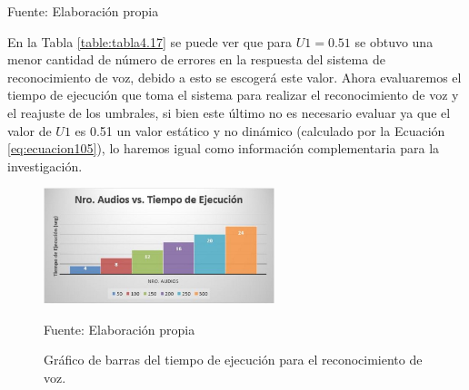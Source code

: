 \begin{center}
\begin{table}[H]
\centering
\caption{\small{Comparación de numero de errores entre U1 = U y U1 = 0.51.}}
\label{table:tabla4.17}
\vskip 0.2cm
\begin{center}
\vskip 0.2cm
{\small{Fuente: Elaboración propia}}
\end{center}
\end{table}
\end{center}

En la Tabla \ref{table:tabla4.17} se puede ver que para $U1 = 0.51$ se obtuvo una menor cantidad de número de errores en la respuesta del sistema de reconocimiento de voz, debido a esto se escogerá este valor.
\vskip 0.5cm
Ahora evaluaremos el tiempo de ejecución que toma el sistema para realizar el reconocimiento de voz y el reajuste de los umbrales, si bien este último no es necesario evaluar ya que el valor de $U1$ es 0.51 un valor estático y no dinámico (calculado por la Ecuación \eqref{eq:ecuacion105}), lo haremos igual como información complementaria para la investigación.

\begin{figure}[H]
\captionsetup{justification=centering}
\begin{center}
\includegraphics[width=0.6\textwidth]{Imagenes/Cap4/image005}
\end{center}
\begin{center}
\vskip -0.5cm
\caption{\small{Gráfico de barras del tiempo de ejecución para el reconocimiento de voz.}}
\label{fig:figura4.5}
{\small{Fuente: Elaboración propia}}
\end{center}
\end{figure}


